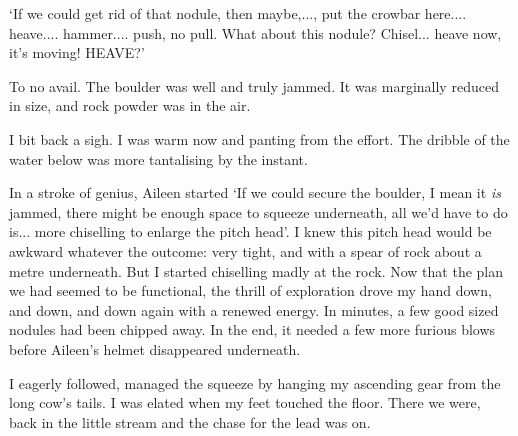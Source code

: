 `If we could get rid of that nodule, then maybe,..., put the crowbar here.... heave.... hammer.... push, no pull. What about this nodule? Chisel... heave now, it's moving! HEAVE?'


To no avail. The boulder was well and truly jammed. It was marginally reduced in size, and rock powder was in the air.

I bit back a sigh. I was warm now and panting from the effort. The dribble of the water below was more tantalising by the instant. 

In a stroke of genius, Aileen started `If we could secure the boulder, I mean it \emph{is} jammed, there might be enough space to squeeze underneath, all we'd have to do is... more chiselling to enlarge the pitch head'.
I knew this pitch head would be awkward whatever the outcome: very tight, and with a spear of rock about a metre underneath. But I started chiselling madly at the rock. Now that the plan we had seemed to be functional, the thrill of exploration drove my hand down, and down, and down again with a renewed energy. In minutes, a few good sized nodules had been chipped away. In the end, it needed a few more furious blows before Aileen's helmet disappeared underneath.

I eagerly followed, managed the squeeze by hanging my ascending gear from the long cow's tails. I was elated when my feet touched the floor. There we were, back in the little stream and the chase for the lead was on.


